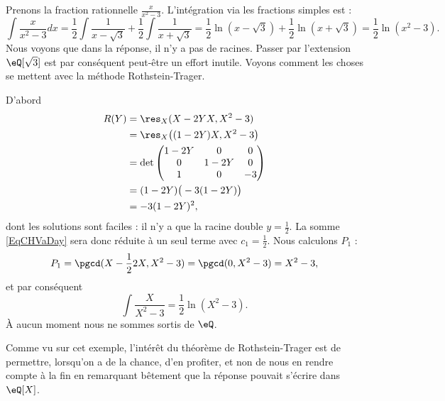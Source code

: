 \begin{example}
    Prenons la fraction rationnelle \( \frac{ x }{ x^2-3 }\). L'intégration via les fractions simples est :
\begin{equation}
    \int\frac{ x }{ x^2-3 }dx=\frac{ 1 }{2}\int\frac{ 1 }{ x-\sqrt{3} }+\frac{ 1 }{2}\int\frac{1}{ x+\sqrt{3} }=\frac{ 1 }{2}\ln(x-\sqrt{3})+\frac{ 1 }{2}\ln(x+\sqrt{3})=\frac{ 1 }{2}\ln(x^2-3).
\end{equation}
Nous voyons que dans la réponse, il n'y a pas de racines. Passer par l'extension \( \eQ[\sqrt{3}]\) est par conséquent peut-être un effort inutile. Voyons comment les choses se mettent avec la méthode Rothstein-Trager.

D'abord
\begin{subequations}
    \begin{align}
        R(Y)&=\res_X(X-2YX,X^2-3)\\
        &=\res_X\big( (1-2Y)X,X^2-3 \big)\\
        &=\det\begin{pmatrix}
            1-2Y    &   0    &   0    \\
            0    &   1-2Y    &   0    \\
            1    &   0    &   -3
        \end{pmatrix}\\
        &=(1-2Y)\big( -3(1-2Y) \big)\\
        &=-3(1-2Y)^2,
    \end{align}
\end{subequations}
dont les solutions sont faciles : il n'y a que la racine double \( y=\frac{ 1 }{2}\). La somme \eqref{EqCHVaDay} sera donc réduite à un seul terme avec \( c_1=\frac{ 1 }{2}\). Nous calculons \( P_1\) :
\begin{equation}
    P_1=\pgcd(X-\frac{ 1 }{2}2X,X^2-3)=\pgcd(0,X^2-3)=X^2-3,
\end{equation}
et par conséquent
\begin{equation}
    \int\frac{ X }{ X^2-3 }=\frac{ 1 }{2}\ln(X^2-3).
\end{equation}
À aucun moment nous ne sommes sortis de \( \eQ\).
\end{example}

Comme vu sur cet exemple, l'intérêt du théorème de Rothstein-Trager est de permettre, lorsqu'on a de la chance, d'en profiter, et non de nous en rendre compte à la fin en remarquant bêtement que la réponse pouvait s'écrire dans \( \eQ[X]\).

